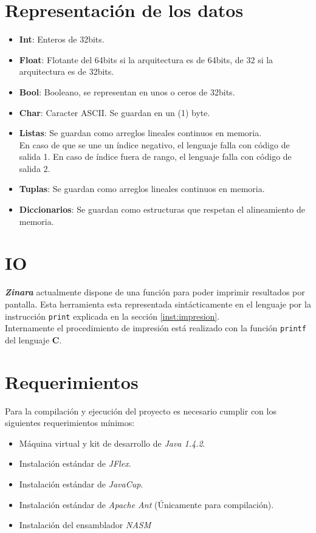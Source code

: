 \documentclass[12pt, spanish]{report}
\begin{document}
\chapter{Representaci\'on de los datos}
\label{chap:impl}
\begin{itemize}
\item \textbf{Int}: Enteros de 32bits.
\item \textbf{Float}: Flotante del 64bits si la arquitectura es de
                      64bits, de 32 si la arquitectura es de 32bits.
\item \textbf{Bool}: Booleano, se representan en unos o ceros de 32bits.
\item \textbf{Char}: Caracter ASCII. Se guardan en un (1) byte.
\item \textbf{Listas}: Se guardan como arreglos lineales continuos en
      memoria.\\
      En caso de que se une un \'indice negativo, el lenguaje falla con
      c\'odigo de salida 1. En caso de \'indice fuera de rango, el
      lenguaje falla con c\'odigo de salida 2.
\item \textbf{Tuplas}: Se guardan como arreglos lineales continuos en memoria.
\item \textbf{Diccionarios}: Se guardan como estructuras que respetan el alineamiento
                       de memoria.
\end{itemize}

\chapter{IO}
\label{chap:io}

\emph{\textbf{Zinara}} actualmente dispone de una función para poder
imprimir resultados por pantalla. Esta herramienta esta representada
sintácticamente en el lenguaje por la instrucción \texttt{print}
explicada en la sección \ref{inst:impresion}.\\

Internamente el procedimiento de impresión está realizado con la
función \texttt{printf} del lenguaje \textbf{C}.

\chapter{Requerimientos}
\label{sec:requ}

Para la compilaci\'on y ejecuci\'on del proyecto es necesario cumplir con
los siguientes requerimientos m\'inimos:

\begin{itemize}
\item M\'aquina virtual y kit de desarrollo de \emph{Java 1.4.2}.
\item Instalaci\'on est\'andar de \emph{JFlex}.
\item Instalaci\'on est\'andar de \emph{JavaCup}.
\item Instalaci\'on est\'andar de \emph{Apache Ant} (\'Unicamente para
  compilaci\'on).
\item Instalación del ensamblador \emph{NASM}
\end{itemize}
\end{document}
